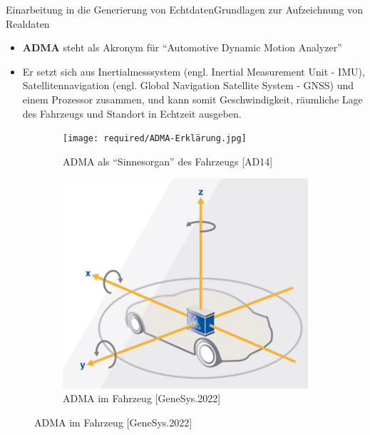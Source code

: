 \documentclass[169, handout	]{THIbeamer} %
\begin{document}
	\begin{frame}{Einarbeitung in die Generierung von Echtdaten}{Grundlagen zur Aufzeichnung von Realdaten}	
		\begin{itemize}
			\item \textbf{ADMA} steht als Akronym für \enquote{Automotive Dynamic Motion Analyzer}
			\item Er setzt sich aus Inertialmesssystem (engl. Inertial Measurement Unit - IMU), Satellitennavigation (engl. Global Navigation Satellite System - GNSS) und einem Prozessor zusammen, und kann somit Geschwindigkeit, räumliche Lage des Fahrzeugs und Standort in Echtzeit ausgeben.
		\end{itemize}
		\begin{figure}
			\centering
    		\begin{subfigure}[b]{0.3\textwidth}
				\texttt{[image: required/ADMA-Erklärung.jpg]}
				\caption{ADMA als \enquote{Sinnesorgan} des Fahrzeugs [AD14]}
        		\label{ADMA Erklärung}
   		 	\end{subfigure}
   		 	\hspace{3cm}
    		\begin{subfigure}[b]{0.3\textwidth}
				\includegraphics[scale=0.3]{required/ADMA.jpg}
				\caption{ADMA im Fahrzeug [GeneSys.2022]}
        		\label{ADMA in Fahrzeug}
    		\end{subfigure}
    		\label{ADMA figures} 
		\end{figure}
	\end{frame}
\end{document}
